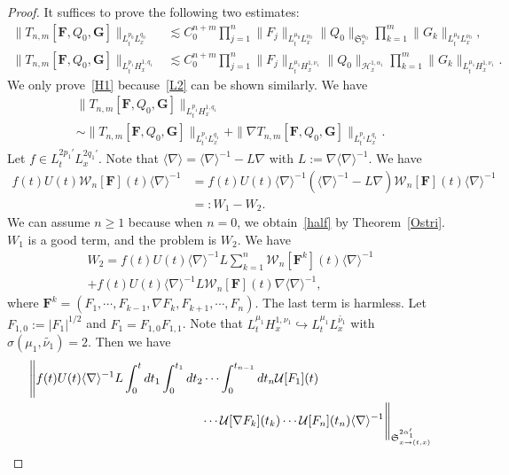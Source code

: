 \documentclass[AHL,Unicode,longabstracts,MathTools,published]{cedram}
\newcommand{\vF}{{\mathbf{F}}}
\newcommand{\vG}{{\mathbf{G}}}
\newcommand{\CH}{\mathcal{H}}
\newcommand{\CU}{\mathcal{U}}
\newcommand{\CW}{\mathcal{W}}
\newcommand{\FS}{\mathfrak{S}}
\newcommand{\al}{\alpha}
\newcommand{\si}{\sigma}
\newcommand{\wt}{\widetilde}
\newcommand{\sd}{\langle \nabla \rangle}
\newcommand{\sdi}{\sd^{-1}}
\newcommand{\tx}{{t,x}}
\newcommand{\na}{\nabla}
\newcommand{\ls}{\lesssim}
\begin{document}
\begin{proof}
It suffices to prove the following two estimates:
\begin{align}
\|T_{n,m} [\vF,Q_0,\vG]\|_{L^{p_0}_t L^{q_0}_x}
&\ls C_0^{n+m}
\prod_{j=1}^n \|F_j\|_{L^{\mu_0}_t L^{\nu_0}_x}
\|Q_0\|_{\FS^{\al_0}_x}
\prod_{k=1}^m \|G_k\|_{L^{\mu_0}_t L^{\nu_0}_x} \label{L2}
,
\\
\|T_{n,m} [\vF,Q_0,\vG]\|_{L^{p_1}_t H^{1,q_1}_x}
&\ls C_0^{n+m}
\prod_{j=1}^n \|F_j\|_{L^{\mu_1}_t H^{1,\nu_1}_x}
\|Q_0\|_{\CH^{1, \al_1}_x}
\prod_{k=1}^m \|G_k\|_{L^{\mu_1}_t H^{1,\nu_1}_x}. \label{H1}
\end{align}
We only prove~\eqref{H1} because~\eqref{L2} can be shown similarly. We have
\begin{multline}
\|T_{n,m}[\vF,Q_0,\vG]\|_{L^{p_1}_t H^{1,q_1}_x} \\
\sim \|T_{n,m}[\vF,Q_0,\vG]\|_{L^{p_1}_t L^{q_1}_x} + \|\na T_{n,m}[\vF,Q_0,\vG]\|_{L^{p_1}_t L^{q_1}_x}.
\end{multline}
Let $f \in L^{2p_1'}_t L^{2q_1'}_x$. Note that $\sd = \sdi - L \na$ with $L:= \na \sdi$. We have
\begin{equation}
\begin{split}
f(t)U(t)\CW_n[\vF](t) \sd^{-1} &= f(t)U(t)\sdi \left(\sdi - L\na\right)\CW_n[\vF](t) \sd^{-1} \\
&=:W_1 - W_2.
\end{split}
\end{equation}
We can assume $n \ge 1$ because when $n=0$, we obtain~\eqref{half} by Theorem~\ref{Ostri}. $W_1$ is a good term, and the problem is $W_2$. We have
\begin{multline}
W_2 = f(t)U(t)\sdi L \sum_{k=1}^n \CW_n[\vF^k](t) \sd^{-1} \\+ f(t)U(t)\sdi L \CW_n[\vF](t) \na \sd^{-1},
\end{multline}
where $\vF^k = (F_1, \cdots, F_{k-1}, \na F_k, F_{k+1}, \cdots, F_n)$. The last term is harmless. Let $F_{1,0}:= |F_1|^{1/2}$ and $F_1 = F_{1,0}F_{1,1}$. Note that $L^{\mu_1}_t H^{1,\nu_1}_x \hookrightarrow L^{\mu_1}_t L^{\wt{\nu_1}}_x$ with $\si(\mu_1, \wt{\nu_1}) =2$. Then we have
\begingroup
\allowdisplaybreaks
\begin{align}
&\Bigg\| f(t)U(t)\sdi L
\int_0^t dt_1
\int_0^{t_1} dt_2 \cdots \int_0^{t_{n-1}} dt_n
\CU[F_1](t) \\
&\mkern250mu\cdots \CU[\na F_k](t_k) \cdots \CU[F_n](t_n) \sdi\Bigg\|_{\FS^{2\al_1'}_{x \to (\tx)}} \nonumber\\

\end{align}
\end{proof}
\end{document}
